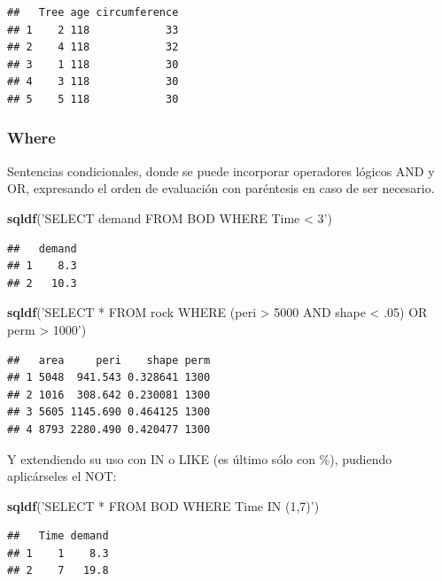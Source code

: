 \documentclass[]{book}
\newenvironment{Shaded}{\begin{snugshade}}{\end{snugshade}}
\newcommand{\KeywordTok}[1]{\textcolor[rgb]{0.13,0.29,0.53}{\textbf{#1}}}
\newcommand{\NormalTok}[1]{#1}
\newcommand{\StringTok}[1]{\textcolor[rgb]{0.31,0.60,0.02}{#1}}
\begin{document}
\begin{verbatim}
##   Tree age circumference
## 1    2 118            33
## 2    4 118            32
## 3    1 118            30
## 4    3 118            30
## 5    5 118            30
\end{verbatim}

\hypertarget{where}{%
\subsubsection{Where}\label{where}}

Sentencias condicionales, donde se puede incorporar operadores lógicos AND y OR, expresando el orden de evaluación con paréntesis en caso de ser necesario.

\begin{Shaded}
\begin{Highlighting}[]
\KeywordTok{sqldf}\NormalTok{(}\StringTok{'SELECT demand FROM BOD WHERE Time < 3'}\NormalTok{)}
\end{Highlighting}
\end{Shaded}

\begin{verbatim}
##   demand
## 1    8.3
## 2   10.3
\end{verbatim}

\begin{Shaded}
\begin{Highlighting}[]
\KeywordTok{sqldf}\NormalTok{(}\StringTok{'SELECT * FROM rock WHERE (peri > 5000 AND shape < .05) OR perm > 1000'}\NormalTok{)}
\end{Highlighting}
\end{Shaded}

\begin{verbatim}
##   area     peri    shape perm
## 1 5048  941.543 0.328641 1300
## 2 1016  308.642 0.230081 1300
## 3 5605 1145.690 0.464125 1300
## 4 8793 2280.490 0.420477 1300
\end{verbatim}

Y extendiendo su uso con IN o LIKE (es último sólo con \%), pudiendo aplicárseles el NOT:

\begin{Shaded}
\begin{Highlighting}[]
\KeywordTok{sqldf}\NormalTok{(}\StringTok{'SELECT * FROM BOD WHERE Time IN (1,7)'}\NormalTok{)}
\end{Highlighting}
\end{Shaded}

\begin{verbatim}
##   Time demand
## 1    1    8.3
## 2    7   19.8
\end{verbatim}
\end{document}
